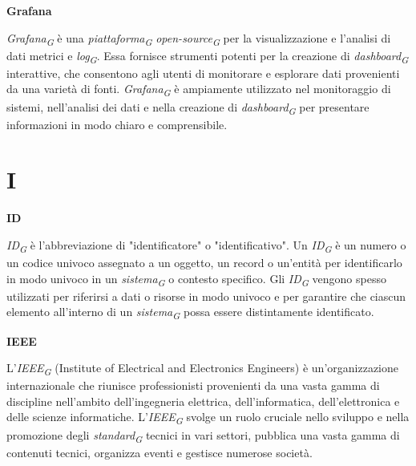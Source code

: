 \documentclass{article}
\begin{document}
\vspace{0.4cm}

\textbf{Grafana}

\vspace{0.1cm}

\textit{Grafana}\textsubscript{\textit{G}} è una \textit{piattaforma}\textsubscript{\textit{G}} \textit{open-source}\textsubscript{\textit{G}} per la visualizzazione e l'analisi di dati metrici e \textit{log}\textsubscript{\textit{G}}. Essa fornisce strumenti potenti per la creazione di \textit{dashboard}\textsubscript{\textit{G}} interattive, che consentono agli utenti di monitorare e esplorare dati provenienti da una varietà di fonti. \textit{Grafana}\textsubscript{\textit{G}} è ampiamente utilizzato nel monitoraggio di sistemi, nell'analisi dei dati e nella creazione di \textit{dashboard}\textsubscript{\textit{G}} per presentare informazioni in modo chiaro e comprensibile.

\pagebreak
\section*{I}
{}

\vspace{0.4cm}

\textbf{ID}

\vspace{0.1cm}

\textit{ID}\textsubscript{\textit{G}} è l'abbreviazione di "identificatore" o "identificativo". Un \textit{ID}\textsubscript{\textit{G}} è un numero o un codice univoco assegnato a un oggetto, un record o un'entità per identificarlo in modo univoco in un \textit{sistema}\textsubscript{\textit{G}} o contesto specifico. Gli \textit{ID}\textsubscript{\textit{G}} vengono spesso utilizzati per riferirsi a dati o risorse in modo univoco e per garantire che ciascun elemento all'interno di un \textit{sistema}\textsubscript{\textit{G}} possa essere distintamente identificato.

\vspace{0.4cm}

\textbf{IEEE}

\vspace{0.1cm}

L'\textit{IEEE}\textsubscript{\textit{G}} (Institute of Electrical and Electronics Engineers) è un'organizzazione internazionale che riunisce professionisti provenienti da una vasta gamma di discipline nell'ambito dell'ingegneria elettrica, dell'informatica, dell'elettronica e delle scienze informatiche. L'\textit{IEEE}\textsubscript{\textit{G}} svolge un ruolo cruciale nello sviluppo e nella promozione degli \textit{standard}\textsubscript{\textit{G}} tecnici in vari settori, pubblica una vasta gamma di contenuti tecnici, organizza eventi e gestisce numerose società.
\end{document}
